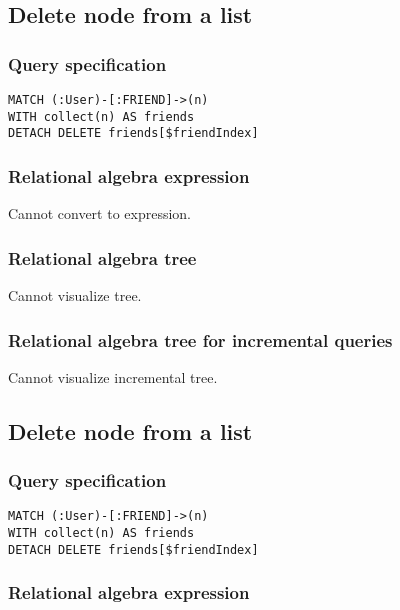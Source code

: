 \subsection{Delete node from a list}

\subsubsection*{Query specification}

\begin{lstlisting}
MATCH (:User)-[:FRIEND]->(n)
WITH collect(n) AS friends
DETACH DELETE friends[$friendIndex]
\end{lstlisting}

\subsubsection*{Relational algebra expression}

Cannot convert to expression.

\subsubsection*{Relational algebra tree}

Cannot visualize tree.

\subsubsection*{Relational algebra tree for incremental queries}

Cannot visualize incremental tree.

\subsection{Delete node from a list}

\subsubsection*{Query specification}

\begin{lstlisting}
MATCH (:User)-[:FRIEND]->(n)
WITH collect(n) AS friends
DETACH DELETE friends[$friendIndex]
\end{lstlisting}

\subsubsection*{Relational algebra expression}

